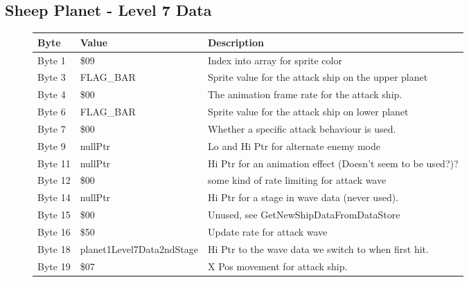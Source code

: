 \clearpage
\subsection{Sheep Planet - Level 7 Data}

\begin{figure}[H]
  {
  \setlength{\tabcolsep}{3.0pt}
  \setlength\cmidrulewidth{\heavyrulewidth} %
  \begin{adjustbox}{width=12cm}

\begin{tabular}{lll}
\toprule
 Byte    & Value                     & Description                                                        \\
\midrule
 Byte 1  & \$09                       & Index into array for sprite color                                  \\
 Byte 3  & FLAG\_BAR                  & Sprite value for the attack ship on the upper planet               \\
 Byte 4  & \$00                       & The animation frame rate for the attack ship.                      \\
 Byte 6  & FLAG\_BAR                  & Sprite value for the attack ship on lower planet                   \\
 Byte 7  & \$00                       & Whether a specific attack behaviour is used.                       \\
 Byte 9  & nullPtr                   & Lo and Hi Ptr for alternate enemy mode                             \\
 Byte 11 & nullPtr                   & Hi Ptr for an animation effect (Doesn't seem to be used?)?         \\
 Byte 12 & \$00                       & some kind of rate limiting for attack wave                         \\
 Byte 14 & nullPtr                   & Hi Ptr for a stage in wave data (never used).                      \\
 Byte 15 & \$00                       & Unused, see GetNewShipDataFromDataStore                            \\
 Byte 16 & \$50                       & Update rate for attack wave                                        \\
 Byte 18 & planet1Level7Data2ndStage & Hi Ptr to the wave data we switch to when first hit.               \\
 Byte 19 & \$07                       & X Pos movement for attack ship.                                    \\

\end{tabular}
\end{adjustbox}}
\end{figure}

